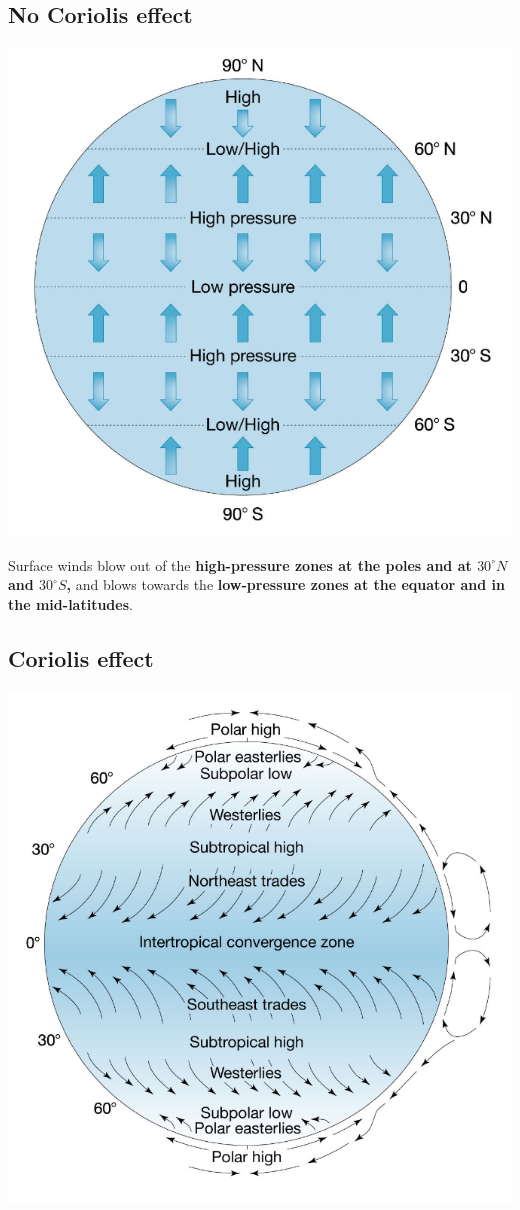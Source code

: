 \documentclass[11pt]{article}
\begin{document}
\subsection{No Coriolis effect}
\label{sec:orgc784052}
\begin{center}
\includegraphics[width=.9\linewidth]{./images/surface-wind-distribution.png}
\end{center}

Surface winds blow out of the \textbf{high-pressure zones at the poles and at \(30^{\circ} N\) and \(30^{\circ} S\),} and blows towards the \textbf{low-pressure zones at the equator and in the mid-latitudes}.
\subsection{Coriolis effect}
\label{sec:orgbc2bf8c}
\begin{center}
\includegraphics[width=.9\linewidth]{./images/surface-wind-distribution-coriolis-effect.png}
\end{center}
\end{document}
